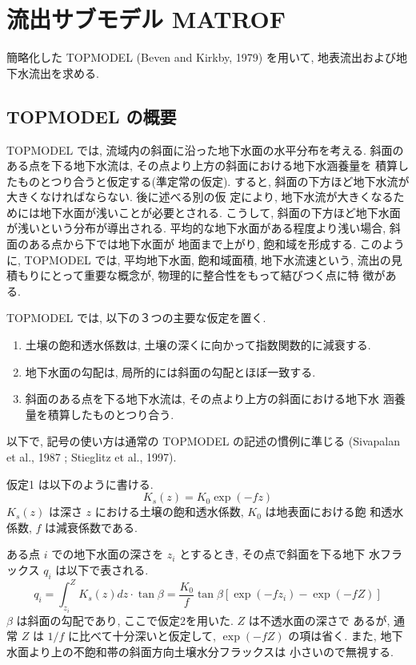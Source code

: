 
\section{流出サブモデル MATROF}

簡略化した TOPMODEL (Beven and Kirkby, 1979) を用いて, 地表流出および地
下水流出を求める.

\subsection{TOPMODEL の概要}

TOPMODEL では, 流域内の斜面に沿った地下水面の水平分布を考える.
斜面のある点を下る地下水流は, その点より上方の斜面における地下水涵養量を
積算したものとつり合うと仮定する(準定常の仮定).
すると, 斜面の下方ほど地下水流が大きくなければならない. 後に述べる別の仮
定により, 地下水流が大きくなるためには地下水面が浅いことが必要とされる.
こうして, 斜面の下方ほど地下水面が浅いという分布が導出される.
平均的な地下水面がある程度より浅い場合, 斜面のある点から下では地下水面が
地面まで上がり, 飽和域を形成する.
このように, TOPMODEL では, 平均地下水面, 飽和域面積, 地下水流速という,
流出の見積もりにとって重要な概念が, 物理的に整合性をもって結びつく点に特
徴がある.

TOPMODEL では, 以下の３つの主要な仮定を置く.
\begin{enumerate}
  \item 土壌の飽和透水係数は, 土壌の深くに向かって指数関数的に減衰する.
  \item 地下水面の勾配は, 局所的には斜面の勾配とほぼ一致する.
  \item 斜面のある点を下る地下水流は, その点より上方の斜面における地下水
	涵養量を積算したものとつり合う.
\end{enumerate}

以下で, 記号の使い方は通常の TOPMODEL の記述の慣例に準じる
(Sivapalan et al., 1987 ; Stieglitz et al., 1997).

仮定1 は以下のように書ける.
\begin{equation}
 K_s(z) = K_0 \exp (-f z)
\end{equation}
$K_s(z)$ は深さ $z$ における土壌の飽和透水係数, $K_0$ は地表面における飽
和透水係数, $f$ は減衰係数である.

ある点 $i$ での地下水面の深さを $z_i$ とするとき, その点で斜面を下る地下
水フラックス $q_i$ は以下で表される.
\begin{equation}
 q_i = \int_{z_i}^Z K_s(z) dz \cdot \tan\beta
   = \frac{K_0}{f}  \tan\beta [\exp(-f z_i) - \exp(-f Z)]
 \label{top_qi}
\end{equation}
$\beta$ は斜面の勾配であり, ここで仮定2を用いた. $Z$ は不透水面の深さで
あるが, 通常 $Z$ は $1/f$ に比べて十分深いと仮定して, $\exp(-f Z)$
の項は省く. また, 地下水面より上の不飽和帯の斜面方向土壌水分フラックスは
小さいので無視する.


